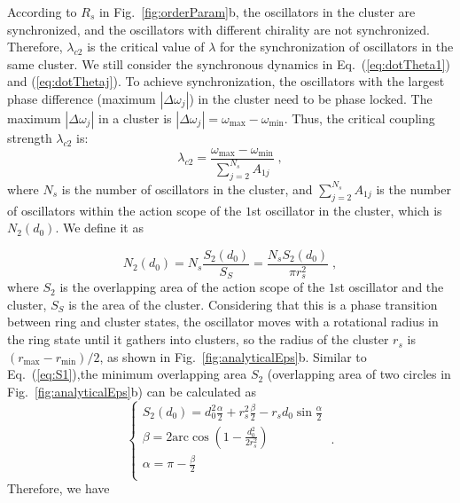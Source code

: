 \documentclass[%
 aip,
 amsmath,amssymb,
 reprint,%
]{revtex4-1}
\begin{document}
According to $R_s$ in Fig.~\ref{fig:orderParam}b, the oscillators in the cluster are synchronized, and the oscillators with different chirality are not synchronized. Therefore, $\lambda_{c2}$ is the critical value of $\lambda$ for the synchronization of oscillators in the same cluster. We still consider the synchronous dynamics in Eq.~(\ref{eq:dotTheta1}) and (\ref{eq:dotThetaj}). To achieve synchronization, the oscillators with the largest phase difference (maximum $\left| \Delta \omega _j \right|$) in the cluster need to be phase locked. The maximum $\left| \Delta \omega _j \right|$ in a cluster is $\left| \Delta \omega _j \right|=\omega _{\max}-\omega _{\min}$. Thus, the critical coupling strength $\lambda_{c2}$ is:
\begin{equation}
    \lambda _{c2}=\frac{\omega _{\max}-\omega _{\min}}{\sum\nolimits_{j=2}^{N_s}{A_{1j}}}\;,
\end{equation}
where $N_s$ is the number of oscillators in the cluster, and $\sum\nolimits_{j=2}^{N_s}{A_{1j}}$ is the number of oscillators within the action scope of the $1$st oscillator in the cluster, which is $N_2\left( d_0 \right)$. We define it as

\begin{equation}
    N_2\left( d_0 \right) =N_s\frac{S_2\left( d_0 \right)}{S_S}=\frac{N_sS_2\left( d_0 \right)}{\pi r_{s}^{2}}\;,
\end{equation}
where $S_2$ is the overlapping area of the action scope of the $1$st oscillator and the cluster, $S_S$ is the area of the cluster. Considering that this is a phase transition between ring and cluster states, the oscillator moves with a rotational radius in the ring state until it gathers into clusters, so the radius of the cluster $r_s$ is $(r_{\max}-r_{\min})/2$, as shown in Fig.~\ref{fig:analyticalEps}b. Similar to Eq.~(\ref{eq:S1}),the minimum overlapping area $S_2$ (overlapping area of two circles in Fig.~\ref{fig:analyticalEps}b) can be calculated as
\begin{equation}
    \begin{cases}
        S_2\left( d_0 \right) =d_{0}^{2}\frac{\alpha}{2}+r_{s}^{2}\frac{\beta}{2}-r_sd_0\sin \frac{\alpha}{2}\\
        \beta =2\mathrm{arc}\cos \left( 1-\frac{d_{0}^{2}}{2r_{s}^{2}} \right)\\
        \alpha =\pi -\frac{\beta}{2}\\
    \end{cases}\;.
\end{equation}
Therefore, we have
\end{document}
